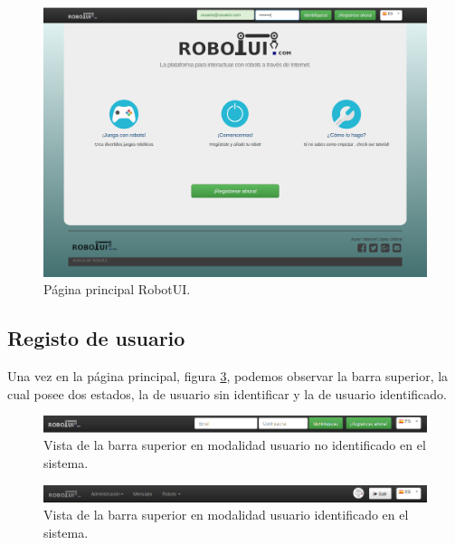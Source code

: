 \begin{figure}[H]
  \begin{center}
    \includegraphics[scale=0.3]{imagenes/manual-usuario/pagina-principal.png}
  \end{center}
  \caption{Página principal RobotUI.}
  \label{website:pagina-principal}
\end{figure}


\subsection{ Registo de usuario }
\label{sec:creacion-usuario}


Una vez en la página principal, figura \ref{website:pagina-principal}, podemos observar la barra superior, la cual posee dos estados, la de usuario sin identificar y la de usuario identificado.


\begin{figure}[H]
  \begin{center}
    \includegraphics[scale=0.5]{imagenes/manual-usuario/barra-menu1.png}
  \end{center}
  \caption{Vista de la barra superior en modalidad usuario no identificado en el sistema.}
  \label{website:pagina-principal}
\end{figure}

\begin{figure}[H]
  \begin{center}
    \includegraphics[scale=0.5]{imagenes/manual-usuario/barra-menu2.png}
  \end{center}
  \caption{Vista de la barra superior en modalidad usuario identificado en el sistema.}
  \label{website:pagina-principal}
\end{figure}



